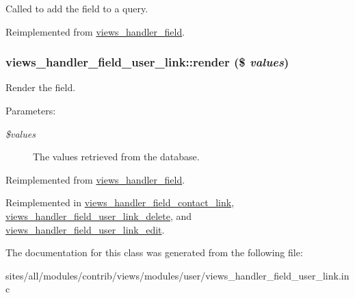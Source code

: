 Called to add the field to a query. 

Reimplemented from \hyperlink{classviews__handler__field_4f661f91bcbe80d4a00c30a31456c502}{views\_\-handler\_\-field}.\hypertarget{classviews__handler__field__user__link_f81b37cfa8e0c2363ad8ed9bb601cd14}{
\subsubsection[{render}]{\setlength{\rightskip}{0pt plus 5cm}views\_\-handler\_\-field\_\-user\_\-link::render (\$ {\em values})}}
\label{classviews__handler__field__user__link_f81b37cfa8e0c2363ad8ed9bb601cd14}


Render the field.

\begin{Desc}
\item[Parameters:]
\begin{description}
\item[{\em \$values}]The values retrieved from the database. \end{description}
\end{Desc}


Reimplemented from \hyperlink{classviews__handler__field_82ff951c5e9ceb97b2eab86f880cbc1e}{views\_\-handler\_\-field}.

Reimplemented in \hyperlink{classviews__handler__field__contact__link_08fa45e6542168dfe0dcdd9f59f7ad45}{views\_\-handler\_\-field\_\-contact\_\-link}, \hyperlink{classviews__handler__field__user__link__delete_8f298b2f0f6edd91efb2c38e6bec03d9}{views\_\-handler\_\-field\_\-user\_\-link\_\-delete}, and \hyperlink{classviews__handler__field__user__link__edit_e52836f8117074b005527bf60e4f536a}{views\_\-handler\_\-field\_\-user\_\-link\_\-edit}.

The documentation for this class was generated from the following file:\begin{CompactItemize}
\item 
sites/all/modules/contrib/views/modules/user/views\_\-handler\_\-field\_\-user\_\-link.inc\end{CompactItemize}
